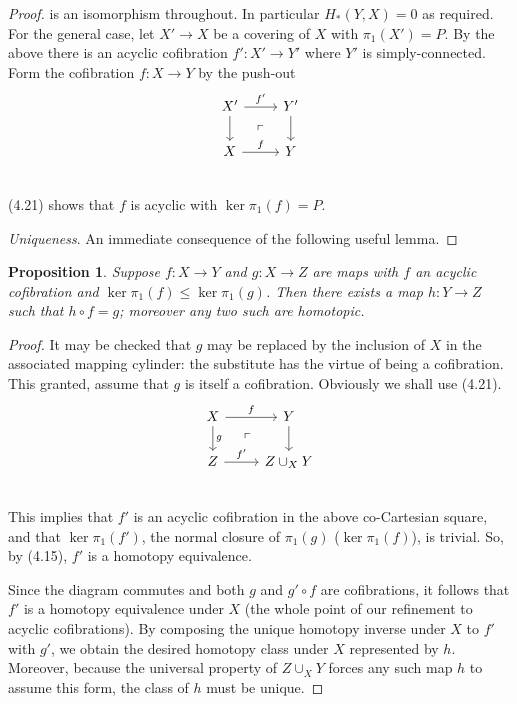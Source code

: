 \documentclass[openany,leqno]{book}  %
\newtheorem{prop}[theorem]{Proposition}
\begin{document}
\begin{proof}
is an isomorphism throughout. In particular $H_*(Y, X) = 0$ as required.
For the general case, let $X' \longrightarrow X$ be a covering of $X$ with $\pi_1(X')= P$. By the above there is an acyclic cofibration $f'\colon  X'\longrightarrow Y'$ where $Y'$ is simply-connected. Form the cofibration $f\colon   X \longrightarrow Y$ by the push-out
\[
 \begin{tikzcd}
 X' \arrow{d} \arrow{r}{f'}  \arrow[dr, phantom, "\ulcorner"]& Y' \arrow{d}\\
 X \arrow{r}{f} & Y\\
 \end{tikzcd}
 \]
(4.21) shows that $f$ is acyclic with $\ker \pi_1(f) = P$.

{\em Uniqueness}. An immediate consequence of the following useful lemma. 

\end{proof}
\begin{prop}
	Suppose $f\colon   X \longrightarrow Y$ and $g \colon   X \longrightarrow Z$ are maps with $f$ an acyclic cofibration and
$\ker \pi_1(f) \leqslant \ker \pi_1(g)$. Then there exists a map $h \colon   Y \longrightarrow Z$ such that $h\circ f = g$; moreover any two such are homotopic.
\end{prop}
\begin{proof}
It may be checked that $g$ may be replaced by the inclusion of $X$ in the associated mapping cylinder: the substitute has the virtue of being a cofibration. This granted, assume that $g$ is itself a cofibration. Obviously we shall use (4.21).
\[
 \begin{tikzcd}
 X \arrow{d}{g} \arrow{r}{f}  \arrow[dr, phantom, "\ulcorner"]& Y \arrow{d}\\
 Z \arrow{r}{f'} & Z\cup_X Y\\
 \end{tikzcd}
 \]
This implies that $f'$ is an acyclic cofibration in the above co-Cartesian square, and that $\ker \pi_1(f')$, the normal closure of $\pi_1(g)$ ($\ker \pi_1(f)$), is trivial. So, by (4.15), $f'$ is a homotopy equivalence.

Since the diagram commutes and both $g$ and $g'\circ f$ are cofibrations, it follows that $f'$ is a homotopy equivalence under $X$ (the whole point of our refinement to acyclic cofibrations). By composing the unique homotopy inverse under $X$ to $f'$ with $g'$, we obtain the desired homotopy class under $X$ represented by $h$. Moreover, because the universal property of $Z\cup_X Y$ forces any such map $h$ to
assume this form, the class of $h$ must be unique.

\end{proof}
\end{document}
